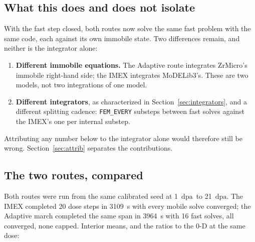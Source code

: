 \documentclass[11pt,a4paper]{article}
\newcommand{\code}[1]{\texttt{\small #1}}
\newcommand{\dpa}{\ensuremath{\mathrm{dpa}}}
\begin{document}
\subsection{What this does and does not isolate}

With the fast step closed, both routes now solve the same fast problem with the
same code, each against its own immobile state. Two differences remain, and
neither is the integrator alone:

\begin{enumerate}
\item \textbf{Different immobile equations.} The Adaptive route integrates
      ZrMicro's immobile right-hand side; the IMEX integrates MoDELib3's.
      These are two models, not two integrations of one model.
\item \textbf{Different integrators}, as characterized in
      Section~\ref{sec:integrators}, and a different splitting cadence:
      \code{FEM\_EVERY} substeps between fast solves against the IMEX's
      one per internal substep.
\end{enumerate}

Attributing any number below to the integrator alone would therefore still be
wrong. Section~\ref{sec:attrib} separates the contributions.

\subsection{The two routes, compared}
\label{sec:routecompare}

Both routes were run from the same calibrated seed at 1~\dpa\ to 21~\dpa. The
IMEX completed 20 dose steps in 3109~s with every mobile solve converged;
the Adaptive march completed the same span in 3964~s with 16 fast solves, all
converged, none capped. Interior means, and the ratios to the 0-D at the same
dose:
\end{document}
